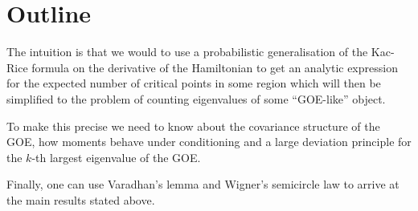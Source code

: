\section{Outline}

The intuition is that we would to use a probabilistic generalisation of the Kac-Rice formula on the derivative of the Hamiltonian to get an analytic expression for the expected number of critical points in some region which will then be simplified to the problem of counting eigenvalues of some ``GOE-like'' object.

To make this precise we need to know about the covariance structure of the GOE, how moments behave under conditioning and a large deviation principle for the $k$-th largest eigenvalue of the GOE.

Finally, one can use Varadhan's lemma and Wigner's semicircle law to arrive at the main results stated above.







